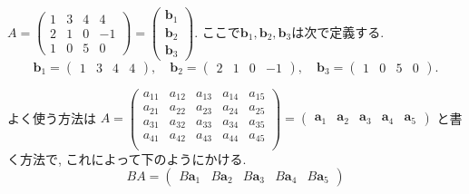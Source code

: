 \documentclass[dvipdfmx,a4paper,11pt]{article} %
\theoremstyle{definition}
\begin{document}
$
A=
  \begin{pmatrix}
 1 &3&4&4 \\
 2&1&0&-1\\
 1&0&5&0
 \end{pmatrix}
 = 
   \begin{pmatrix}
\bm{b}_1\\ \bm{b}_2\\ \bm{b}_3
 \end{pmatrix}
$.
ここで$\bm{b}_1, \bm{b}_2, \bm{b}_3$は次で定義する. 
$$
\bm{b}_1 = 
  \begin{pmatrix}
 1 &3 &4&4
 \end{pmatrix},\quad
\bm{b}_2= 
  \begin{pmatrix}
 2&1 &0&-1
 \end{pmatrix},\quad
 \bm{b}_3 = 
  \begin{pmatrix}
 1 &0 &5&0
 \end{pmatrix}.
 $$

よく使う方法は
$
A   =
\begin{pmatrix}
a_{11}& a_{12} &a_{13}& a_{14} & a_{15}  \\
a_{21}& a_{22} & a_{23}& a_{24} & a_{25}   \\
a_{31}& a_{32} &a_{33}& a_{34} & a_{35}  \\
a_{41}& a_{42} &a_{43}& a_{44} & a_{45}  \\
\end{pmatrix}
=
    \begin{pmatrix}
    \bm{a}_1&\bm{a}_2&\bm{a}_3&\bm{a}_4&\bm{a}_5
    \end{pmatrix}
$
と書く方法で, これによって下のようにかける. 
$$
BA
=
    \begin{pmatrix}
    B\bm{a}_1&B\bm{a}_2&B\bm{a}_3&B\bm{a}_4&B\bm{a}_5
    \end{pmatrix}
$$
\end{document}
